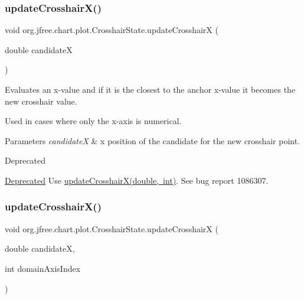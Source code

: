 \subsubsection{\texorpdfstring{update\+Crosshair\+X()}{updateCrosshairX()}\hspace{0.1cm}{\footnotesize\ttfamily [1/2]}}
{\footnotesize\ttfamily void org.\+jfree.\+chart.\+plot.\+Crosshair\+State.\+update\+CrosshairX (\begin{DoxyParamCaption}\item[{double}]{candidateX }\end{DoxyParamCaption})}

Evaluates an x-\/value and if it is the closest to the anchor x-\/value it becomes the new crosshair value. 

Used in cases where only the x-\/axis is numerical.


\begin{DoxyParams}{Parameters}
{\em candidateX} & x position of the candidate for the new crosshair point.\\
\hline
\end{DoxyParams}
\begin{DoxyRefDesc}{Deprecated}
\item[\mbox{\hyperlink{deprecated__deprecated000058}{Deprecated}}]Use \mbox{\hyperlink{classorg_1_1jfree_1_1chart_1_1plot_1_1_crosshair_state_a9b235fd9fe053eb9f36c219a4d5d8231}{update\+Crosshair\+X(double, int)}}. See bug report 1086307. \end{DoxyRefDesc}
\mbox{\label{classorg_1_1jfree_1_1chart_1_1plot_1_1_crosshair_state_a9b235fd9fe053eb9f36c219a4d5d8231}} 
\subsubsection{\texorpdfstring{update\+Crosshair\+X()}{updateCrosshairX()}\hspace{0.1cm}{\footnotesize\ttfamily [2/2]}}
{\footnotesize\ttfamily void org.\+jfree.\+chart.\+plot.\+Crosshair\+State.\+update\+CrosshairX (\begin{DoxyParamCaption}\item[{double}]{candidateX,  }\item[{int}]{domain\+Axis\+Index }\end{DoxyParamCaption})}

